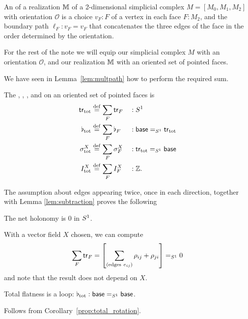 \begin{mydef}
An  of a realization \( \mathbb{M} \) of a 2-dimensional simplicial complex \( M=[M_0,M_1,M_2] \) with orientation \( \mathscr{O} \) is a choice \( v_F:F \) of a vertex in each face \( F:M_2 \), and the boundary path \( \ell_F:v_F=v_F \) that concatenates the three edges of the face in the order determined by the orientation.
\end{mydef}

For the rest of the note we will equip our simplicial complex \( M \) with an orientation \( \mathscr{O} \), and our realization \( \mathbb{M} \) with an oriented set of pointed faces.

We have seen in Lemma~\ref{lem:multpath} how to perform the required sum.
\begin{mydef}
The , , , and  on an oriented set of pointed faces is
\begin{equation}
\label{eq:tot_elements}
\begin{aligned}
\mathsf{tr}_{\mathrm{tot}}      & \stackrel{\mathrm{def}}{=} \sum_F\mathsf{tr}_F &&:S^1\\
\flat_{\mathrm{tot}}    & \stackrel{\mathrm{def}}{=} \sum_F\flat_F &&:\mathsf{base}=_{S^1}\mathsf{tr}_{\mathrm{tot}}\\
\sigma^X_{\mathrm{tot}} & \stackrel{\mathrm{def}}{=} \sum_F\sigma^X_F &&:\mathsf{tr}_{\mathrm{tot}}=_{S^1}\mathsf{base}\\
I^X_{\mathrm{tot}}      & \stackrel{\mathrm{def}}{=} \sum_F I^X_F &&:\mathbb{Z}.
\end{aligned}
\end{equation}
\end{mydef}

The assumption about edges appearing twice, once in each direction, together with Lemma \ref{lem:subtraction} proves the following
\begin{myprop}The net holonomy is \( 0 \) in \( S^1 \).\label{prop:total_rotation}
\end{myprop}
\begin{myproof}
With a vector field \( X \) chosen, we can compute \[ \sum_F\mathsf{tr}_F=\left[\sum_{(\mathrm{edges\ }e_{ij})} \rho_{ij}+\rho_{ji}\right]=_{S^1}0 \] and note that the result does not depend on \( X \).
\end{myproof}

\begin{mycor}
Total flatness is a loop: \( \flat_{\mathrm{tot}}:\mathsf{base}=_{S^1}\mathsf{base} \).
\end{mycor}\begin{myproof}Follows from Corollary~\ref{prop:total_rotation}.\end{myproof}

